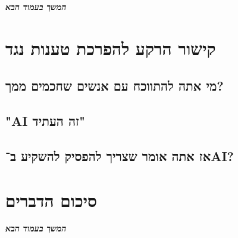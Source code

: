 \documentclass[]{article}
\newcommand\npage {\vfil {\hfil \textbf{\textit{המשך בעמוד הבא}}} \hfil \vfil \pagebreak}
\theoremstyle{definition}
\begin{document}
	\npage
	
	\section{קישור הרקע להפרכת טענות נגד}
	\subsection{מי אתה להתווכח עם אנשים שחכמים ממך?}
	\subsection{"AI זה העתיד"}
	\subsection{אז אתה אומר שצריך להפסיק להשקיע ב־AI?}
	
	\section{סיכום הדברים}
	
	\npage
\end{document}
